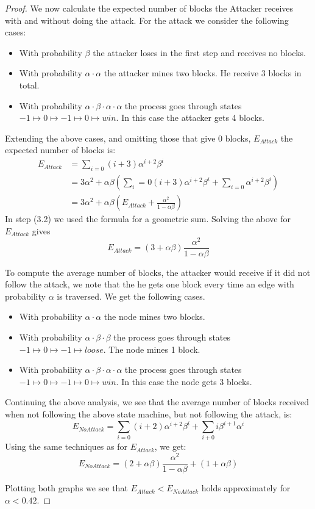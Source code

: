 \begin{proof}
	We now calculate the expected number of blocks the Attacker receives with and without doing the attack. 
	For the attack we consider the following cases:
	\begin{itemize}
		\item With probability $\beta$ the attacker loses in the first step and receives no blocks.
		\item With probability $\alpha\cdot \alpha$ the attacker mines two blocks. He receive 3 blocks in total.
		\item With probability $\alpha\cdot\beta\cdot \alpha\cdot \alpha$ the process goes through states $-1\mapsto 0 \mapsto -1 \mapsto 0 \mapsto win$.
		In this case the attacker gets 4 blocks.
	\end{itemize}
	Extending the above cases, and omitting those that give 0 blocks,
	$E_{Attack}$ the expected number of blocks is:
	\begin{align}
		E_{Attack}&=\sum_{i=0}(i+3)\alpha^{i+2}\beta^{i}\\
				  &=3\alpha^2+\alpha\beta\left(\sum_i=0(i+3)\alpha^{i+2}\beta^i +\sum_{i=0}\alpha^{i+2}\beta^i\right)\\
				  &=3\alpha^2+\alpha\beta\left(E_{Attack} +\frac{\alpha^2}{1-\alpha\beta}\right)
	\end{align}
	In step (3.2) we used the formula for a geometric sum.
	Solving the above for $E_{Attack}$ gives
	\[
		E_{Attack}=(3+\alpha\beta)\frac{\alpha^2}{1-\alpha\beta}
	\]
	
	To compute the average number of blocks, the attacker would receive if it did not follow the attack, we note that the he gets one block every time an edge with probability $\alpha$ is traversed. We get the following cases.
	\begin{itemize}
		\item With probability $\alpha\cdot \alpha$ the node mines two blocks.
		\item With probability $\alpha\cdot\beta\cdot \beta$ the process goes through states $-1\mapsto 0 \mapsto -1 \mapsto loose$. The node mines 1 block.
		\item With probability $\alpha\cdot\beta\cdot \alpha\cdot \alpha$ the process goes through states $-1\mapsto 0 \mapsto -1 \mapsto 0 \mapsto win$.
		In this case the node gets 3 blocks.
	\end{itemize}
	Continuing the above analysis, we see that the average number of blocks received when not following the above state machine, but not following the attack, is:
	\[
	E_{NoAttack}=\sum_{i=0}(i+2)\alpha^{i+2}\beta^i + \sum_{i+0}i\beta^{i+1}\alpha^i
	\]
	Using the same techniques as for $E_{Attack}$, we get:
	\[
	E_{NoAttack}=(2+\alpha\beta)\frac{\alpha^2}{1-\alpha\beta}+(1+\alpha\beta)
	\]
	
	Plotting both graphs we see that $E_{Attack}<E_{NoAttack}$ holds approximately for $\alpha<0.42$.
\end{proof}


